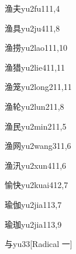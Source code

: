 \begin{entry}{渔夫}{yu2fu1}{11,4}
\end{entry}

\begin{entry}{渔具}{yu2ju4}{11,8}
\end{entry}

\begin{entry}{渔捞}{yu2lao1}{11,10}
\end{entry}

\begin{entry}{渔猎}{yu2lie4}{11,11}
\end{entry}

\begin{entry}{渔笼}{yu2long2}{11,11}
\end{entry}

\begin{entry}{渔轮}{yu2lun2}{11,8}
\end{entry}

\begin{entry}{渔民}{yu2min2}{11,5}
\end{entry}

\begin{entry}{渔网}{yu2wang3}{11,6}
\end{entry}

\begin{entry}{渔汛}{yu2xun4}{11,6}
\end{entry}

\begin{entry}{愉快}{yu2kuai4}{12,7}
\end{entry}

\begin{entry}{瑜伽}{yu2jia1}{13,7}
\end{entry}

\begin{entry}{瑜珈}{yu2jia1}{13,9}
\end{entry}

\begin{entry}{与}{yu3}{3}[Radical 一]
\end{entry}

